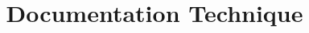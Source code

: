 \documentclass{rapport}
\title{Documentation Technique}
\begin{document}
    
    \tableofcontents
  
	\begin{sloppypar}
	  		
	  	
	  			
	  			
	\end{sloppypar}
\end{document}
